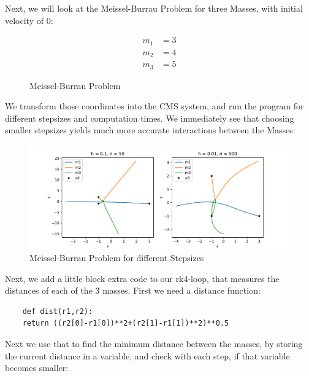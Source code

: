 \documentclass{article}
\begin{document}
Next, we will look at the Meissel-Burrau Problem for three Masses, with initial
velocity of 0:
\begin{figure}[ht]
    \centering
\begin{subfigure}{.2\textwidth}
    \begin{align*}
	m_1 &= 3 \\
	m_2 &= 4 \\
	m_3 &= 5
    \end{align*}
\end{subfigure}
\begin{subfigure}{.3\textwidth}
    \centering
{}
\end{subfigure}
\caption{Meissel-Burrau Problem}
\end{figure}

We transform those coordinates into the CMS system, and run the program for
different stepsizes and computation times. We immediately see that choosing
smaller stepsizes yields much more accurate interactions between the Masses:
\begin{figure}[H]
    \centering
    \includegraphics[width=\textwidth]{fig2b_large.pdf} 
    \caption{Meissel-Burrau Problem for different Stepsizes} 
    \label{fig:2b}
\end{figure}

Next, we add a little block extra code to our rk4-loop, that measures the
distances of each of the 3 masses. First we need a distance function:
\begin{lstlisting}
    def dist(r1,r2):
	return ((r2[0]-r1[0])**2+(r2[1]-r1[1])**2)**0.5
\end{lstlisting}
Next we use that to find the minimum distance between the masses, by storing
the current distance in a variable, and check with each step, if that variable
becomes smaller:
\end{document}
